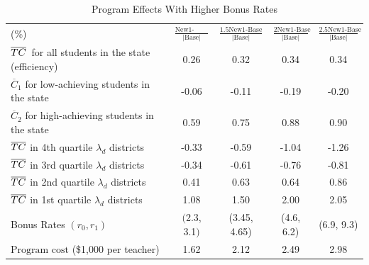 \documentclass[notitlepage,12pt]{article}%
\begin{document}
\begin{table}[ptb]
\caption{Program Effects With Higher Bonus Rates}%
\label{tab:XXX2}
\begin{center}%
\begin{tabular}
[c]{lcccc}\hline\hline
(\%) & $\frac{\text{New1-Base}}{\left\vert \text{Base}\right\vert }$ &
$\frac{1.5\text{New1-Base}}{\left\vert \text{Base}\right\vert }$ &
$\frac{2\text{New1-Base}}{\left\vert \text{Base}\right\vert }$ &
$\frac{2.5\text{New1-Base}}{\left\vert \text{Base}\right\vert }$\\
$\overline{{\small TC}}${\small \ for all students in the state (efficiency)}
& 0.26 & 0.32 & 0.34 & 0.34\\
$\overline{C}_{1}$ {\small for low-achieving students in the state} & -0.06 &
-0.11 & -0.19 & -0.20\\
$\overline{C}_{2}$ {\small for high-achieving students in the state} & 0.59 &
0.75 & 0.88 & 0.90\\
$\overline{{\small TC}}\ ${\small in 4th quartile }$\lambda_{d}$
{\small districts} & -0.33 & -0.59 & -1.04 & -1.26\\
$\overline{{\small TC}}\ ${\small in 3rd quartile }$\lambda_{d}$
{\small districts} & -0.34 & -0.61 & -0.76 & -0.81\\
$\overline{{\small TC}}\ ${\small in 2nd quartile }$\lambda_{d}$
{\small districts} & 0.41 & 0.63 & 0.64 & 0.86\\
$\overline{{\small TC}}$ {\small in 1st quartile }$\lambda_{d}$
{\small districts} & 1.08 & 1.50 & 2.00 & 2.05\\\hline
Bonus Rates $\left(  r_{0},r_{1}\right)  $ & $($2.3, 3.1$)$ & (3.45, 4.65) &
(4.6, 6.2) & (6.9, 9.3)\\
Pr$\text{ogram cost }$(\$1,000 per teacher) & 1.62 & 2.12 & 2.49 &
2.98\\\hline\hline
\end{tabular}
\end{center}
\end{table}
\end{document}
